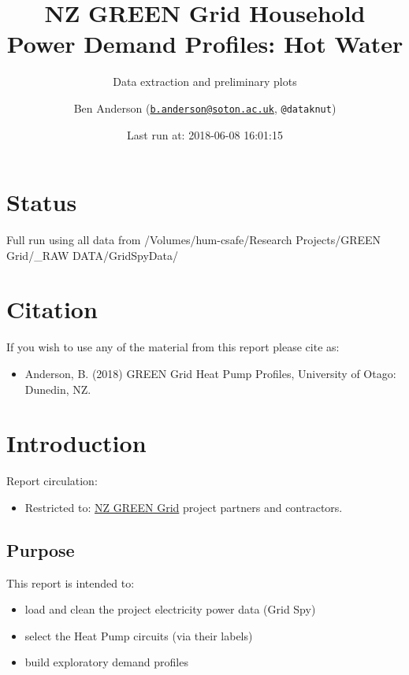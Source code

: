 \documentclass[]{article}
\title{NZ GREEN Grid Household Power Demand Profiles: Hot Water}
\subtitle{Data extraction and preliminary plots}
\author{Ben Anderson
(\href{mailto:b.anderson@soton.ac.uk}{\nolinkurl{b.anderson@soton.ac.uk}},
\texttt{@dataknut})}
\date{Last run at: 2018-06-08 16:01:15}
\providecommand{\tightlist}{%
  \setlength{\itemsep}{0pt}\setlength{\parskip}{0pt}}
\begin{document}
\maketitle

{
\setcounter{tocdepth}{2}
\tableofcontents
}
\newpage

\section{Status}\label{status}

Full run using all data from /Volumes/hum-csafe/Research Projects/GREEN
Grid/\_RAW DATA/GridSpyData/

\section{Citation}\label{citation}

If you wish to use any of the material from this report please cite as:

\begin{itemize}
\tightlist
\item
  Anderson, B. (2018) GREEN Grid Heat Pump Profiles, University of
  Otago: Dunedin, NZ.
\end{itemize}

\newpage

\section{Introduction}\label{introduction}

Report circulation:

\begin{itemize}
\tightlist
\item
  Restricted to:
  \href{https://www.otago.ac.nz/centre-sustainability/research/energy/otago050285.html}{NZ
  GREEN Grid} project partners and contractors.
\end{itemize}

\subsection{Purpose}\label{purpose}

This report is intended to:

\begin{itemize}
\tightlist
\item
  load and clean the project electricity power data (Grid Spy)
\item
  select the Heat Pump circuits (via their labels)
\item
  build exploratory demand profiles
\end{itemize}
\end{document}
